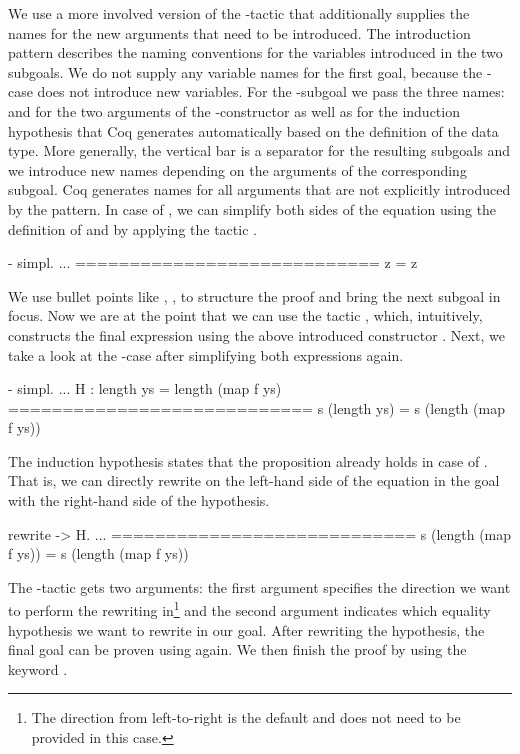 We use a more involved version of the \--tactic that additionally supplies the names for the new arguments that need to be introduced.
The introduction pattern \cinl{[ | y ys H ]} describes the naming conventions for the variables introduced in the two subgoals.
We do not supply any variable names for the first goal, because the \--case does not introduce new variables.
For the \--subgoal we pass the three names:  and  for the two arguments of the \--constructor as well as  for the induction hypothesis that Coq generates automatically based on the definition of the  data type.
More generally, the vertical bar is a separator for the resulting
subgoals and we introduce new names depending on the arguments of the
corresponding subgoal.
Coq generates names for all arguments that are not explicitly introduced by the pattern.
In case of , we can simplify both sides of the equation using the definition of  and  by applying the tactic .

\begin{cproof}{- simpl.}
  ...
  ============================
  z = z
\end{cproof}

We use bullet points like \cinl{-}, \cinl{+}, \cinl{*} to structure the proof and bring the next subgoal in focus.
Now we are at the point that we can use the tactic , which, intuitively, constructs the final expression using the above introduced constructor .
Next, we take a look at the \--case after simplifying both expressions again.

\begin{cproof}{- simpl.}
  ...
  H : length ys = length (map f ys)
  ============================
  s (length ys) = s (length (map f ys))
\end{cproof}

The induction hypothesis  states that the proposition already holds in case of .
That is, we can directly rewrite  on the left\--hand side of the equation in the goal with the right\--hand side of the hypothesis.

\begin{cproof}{rewrite -> H.}
  ...
  ============================
  s (length (map f ys)) =
  s (length (map f ys))
\end{cproof}

The \--tactic gets two arguments: the first argument specifies the direction we want to perform the rewriting in\footnote{The direction from left\--to\--right is the default and does not need to be provided in this case.} and the second argument indicates which equality hypothesis we want to rewrite in our goal.
After rewriting the hypothesis, the final goal can be proven using  again.
We then finish the proof by using the keyword .

